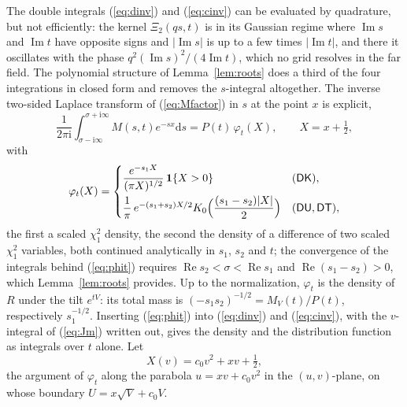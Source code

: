 \documentclass[ecta,nameyear,final]{econsocart}
\newcommand{\dr}[1]{{\mathrm d}#1}
\newcommand{\iu}{{\mathrm i}}
\newcommand{\Rea}{\operatorname{Re}}
\newcommand{\Ima}{\operatorname{Im}}
\newcommand{\Fk}{\textsf{\upshape DK}}
\newcommand{\Fu}{\textsf{\upshape DU}}
\newcommand{\Ft}{\textsf{\upshape DT}}
\theoremstyle{plain}
\theoremstyle{definition}
\begin{document}
The double integrals (\ref{eq:dinv}) and (\ref{eq:cinv}) can be evaluated by quadrature, but not efficiently: the kernel $\Xi_2(qs,t)$ is in its Gaussian regime where $\Ima s$ and $\Ima t$ have opposite signs and $|\Ima s|$ is up to a few times $|\Ima t|$, and there it oscillates with the phase $q^2(\Ima s)^2/(4\Ima t)$, which no grid resolves in the far field.  The polynomial structure of Lemma~\ref{lem:roots} does a third of the four integrations in closed form and removes the $s$-integral altogether.  The inverse two-sided Laplace transform of (\ref{eq:Mfactor}) in $s$ at the point $x$ is explicit,
\begin{equation}
\frac{1}{2\pi\iu}\int_{\sigma-\iu\infty}^{\sigma+\iu\infty}M(s,t)e^{-sx}\dr{s}=P(t)\,\varphi_t(X),\qquad X=x+\tfrac12,
\label{eq:phit}
\end{equation}
with
\begin{equation}
\varphi_t(X)=\begin{cases}\dfrac{e^{-s_1X}}{(\pi X)^{1/2}}\,\mathbf{1}\{X>0\}&(\Fk),\\[2ex]
\dfrac1\pi\,e^{-(s_1+s_2)X/2}K_0\Big(\dfrac{(s_1-s_2)|X|}{2}\Big)&(\Fu,\Ft),\end{cases}
\label{eq:varphi}
\end{equation}
the first a scaled $\chi^2_1$ density, the second the density of a difference of two scaled $\chi^2_1$ variables, both continued analytically in $s_1$, $s_2$ and $t$; the convergence of the integrals behind (\ref{eq:phit}) requires $\Rea s_2<\sigma<\Rea s_1$ and $\Rea(s_1-s_2)>0$, which Lemma~\ref{lem:roots} provides.  Up to the normalization, $\varphi_t$ is the density of $R$ under the tilt $e^{tV}$: its total mass is $(-s_1s_2)^{-1/2}=M_V(t)/P(t)$, respectively $s_1^{-1/2}$.  Inserting (\ref{eq:phit}) into (\ref{eq:dinv}) and (\ref{eq:cinv}), with the $v$-integral of (\ref{eq:Jm}) written out, gives the density and the distribution function as integrals over $t$ alone.  Let
\begin{equation}
X(v)=c_0v^2+xv+\tfrac12,
\label{eq:Xv}
\end{equation}
the argument of $\varphi_t$ along the parabola $u=xv+c_0v^2$ in the $(u,v)$-plane, on whose boundary $U=x\sqrt V+c_0V$.
\end{document}
